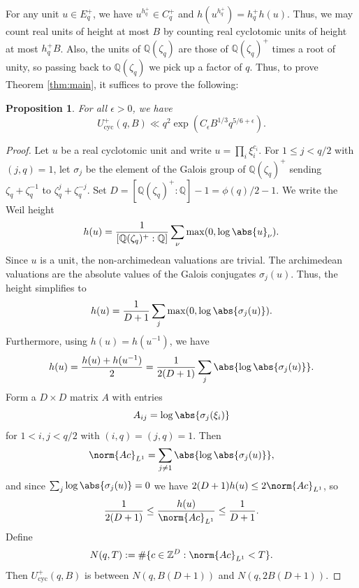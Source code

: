 \documentclass{article}
\newtheorem{prop}{Proposition}
\newcommand{\bQ}{\mathbb{Q}}
\newcommand{\bZ}{\mathbb{Z}}
\DeclareMathOperator{\cyc}{cyc}
\begin{document}
For any unit $u \in E_q^+$, we have $u^{h_q^+} \in C_q^+$ and $h(u^{h_q^+}) = h_q^+ h(u)$. Thus, we may count real units of height at most $B$ by counting real cyclotomic units of height at most $h_q^+ B$. Also, the units of $\bQ(\zeta_q)$ are those of $\bQ(\zeta_q)^+$ times a root of unity, so passing back to $\bQ(\zeta_q)$ we pick up a factor of $q$. Thus, to prove Theorem \ref{thm:main}, it suffices to prove the following:

\begin{prop}

    For all $\epsilon > 0$, we have $$U^+_{\cyc}(q,B) \ll q^2 \exp(C_{\epsilon} B^{1/3} q^{5/6+\epsilon}).$$
\end{prop}
\begin{proof}


Let $u$ be a real cyclotomic unit and write $u = \prod_i \xi_i^{c_i}$. For $1 \leq j < q/2$ with $(j,q) = 1$, let $\sigma_j$ be the element of the Galois group of $\bQ(\zeta_q)^+$ sending $\zeta_q+\zeta_q^{-1}$ to $\zeta_q^j+\zeta_q^{-j}$. Set $D=[\bQ(\zeta_q)^+ : \bQ]-1 = \phi(q)/2-1$. We write the Weil height
\[
h(u) = \frac{1}{[\bQ(\zeta_q)^+ : \bQ]} \sum_{\nu} \max(0, \log \abs{u}_\nu).
\]
Since $u$ is a unit, the non-archimedean valuations are trivial. The archimedean valuations are the absolute values of the Galois conjugates $\sigma_j(u)$. Thus, the height simplifies to
\[
h(u) = \frac{1}{D+1} \sum_j \max(0, \log \abs{\sigma_j(u)}).
\]
Furthermore, using $h(u) = h(u^{-1})$, we have
\begin{align*}
h(u) = \frac{h(u) + h(u^{-1})}{2} = \frac{1}{2(D+1)} \sum_{j} \abs{\log \abs{\sigma_j(u)}}.
\end{align*}
Form a $D \times D$ matrix $A$ with entries
\[
A_{ij} = \log \abs{\sigma_j(\xi_i)}
\]
for $1 < i, j < q/2$ with $(i,q)=(j,q)=1$. Then
\[
\norm{A c}_{L^1} = \sum_{j \neq 1} \abs{\log \abs{\sigma_j(u)}},
\]
and since $\sum_j \log \abs{\sigma_j(u)} = 0$ we have $2(D+1)h(u) \leq 2\norm{A c}_{L^1}$, so 
\[
\frac{1}{2(D+1)}
\leq \frac{h(u)}{\norm{A c}_{L^1}} \leq \frac{1}{D+1}.
\]
Define
\begin{align*}
N(q,T) :=
\# \{ c \in \bZ^D : \norm{A c}_{L^1} < T \}.
\end{align*}
Then $U^+_{\cyc}(q,B)$ is between $N(q,B(D+1))$ and $N(q,2B(D+1))$.


\end{proof}
\end{document}
